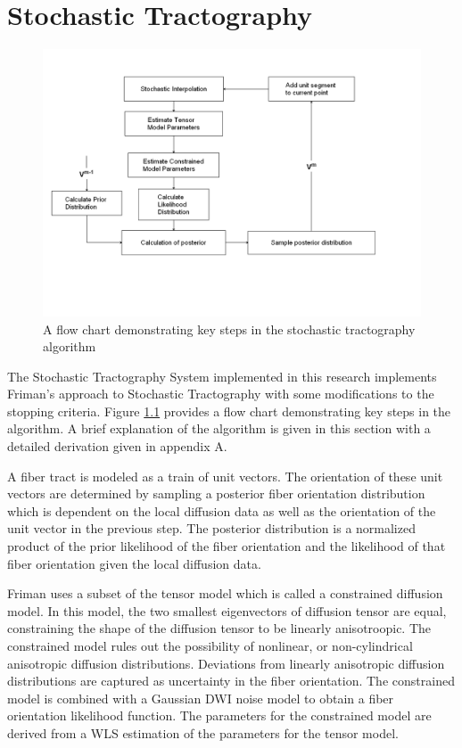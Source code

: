 \chapter{Stochastic Tractography}
\begin{figure} \label{fig:stflow}
  \center 
	\includegraphics[trim = 10mm 50mm 20mm 30mm, clip, width=\linewidth]{stflow}
	\caption{A flow chart demonstrating key steps in the stochastic tractography algorithm}
\end{figure}
The Stochastic Tractography System implemented in this research implements Friman's \cite{frimanTMI06} approach to Stochastic Tractography with some modifications to the stopping criteria.  Figure \ref{fig:stflow} provides a flow chart demonstrating key steps in the algorithm.  A brief explanation of the algorithm is given in this section with a detailed derivation given in appendix A.

A fiber tract is modeled as a train of unit vectors.  The orientation of these unit vectors are determined by sampling a posterior fiber orientation distribution which is dependent on the local diffusion data as well as the orientation of the unit vector in the previous step.  The posterior distribution is a normalized product of the prior likelihood of the fiber orientation and the likelihood of that fiber orientation given the local diffusion data.

Friman uses a subset of the tensor model which is called a constrained diffusion model.  In this model, the two smallest eigenvectors of diffusion tensor are equal, constraining the shape of the diffusion tensor to be linearly anisotroopic.  The constrained model rules out the possibility of nonlinear, or non-cylindrical anisotropic diffusion distributions.  Deviations from linearly anisotropic diffusion distributions are captured as uncertainty in the fiber orientation.  The constrained model is combined with a Gaussian DWI noise model to obtain a fiber orientation likelihood function.  The parameters for the constrained model are derived from a WLS estimation of the parameters for the tensor model.

